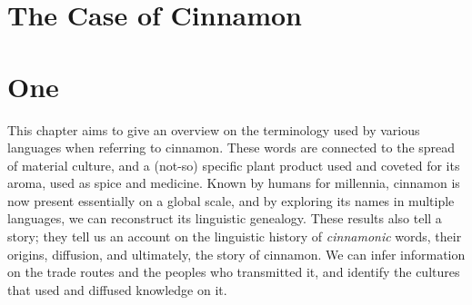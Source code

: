 









\section{The Case of Cinnamon}
\label{ch:cinnamon}

\section{One}


This chapter aims to give an overview on the terminology used by various languages when referring to cinnamon. These words are connected to the spread of material culture, and a (not-so) specific plant product used and coveted for its aroma, used as spice and medicine. Known by humans for millennia, cinnamon is now present essentially on a global scale, and by exploring its names in multiple languages, we can reconstruct its linguistic genealogy. These results also tell a story; they tell us an account on the linguistic history of \emph{cinnamonic} words, their origins, diffusion, and ultimately, the story of cinnamon. We can infer information on the trade routes and the peoples who transmitted it, and identify the cultures that used and diffused knowledge on it. 

